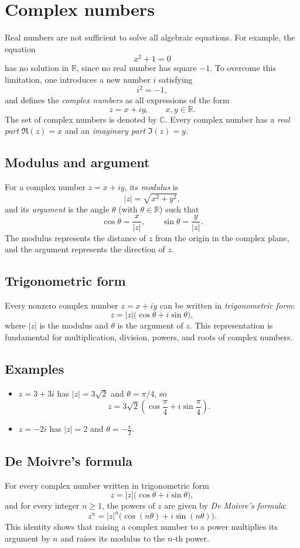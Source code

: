 \documentclass[11pt,a4paper]{article}
\theoremstyle{definition} \newtheorem{definition}{Definition} \theoremstyle{plain} \newtheorem{theorem}{Theorem}
\begin{document}
\section{Complex numbers}\label{sec:complex}
Real numbers are not sufficient to solve all algebraic equations.
For example, the equation
\[ x^2 + 1 = 0 \]
has no solution in $\mathbb{R}$, since no real number has square $-1$.
To overcome this limitation, one introduces a new number $i$ satisfying
\[ i^2 = -1, \]
and defines the \emph{complex numbers} as all expressions of the form
\[ z = x + iy, \qquad x,y\in\mathbb{R}. \]
The set of complex numbers is denoted by $\mathbb{C}$.
Every complex number has a \emph{real part} $\Re(z)=x$ and an \emph{imaginary part} $\Im(z)=y$.
\subsection{Modulus and argument}
For a complex number $z=x+iy$, its \emph{modulus} is
\[ |z| = \sqrt{x^2 + y^2}, \]
and its \emph{argument} is the angle $\theta$ (with $\theta\in\mathbb{R}$) such that
\[ \cos\theta = \frac{x}{|z|}, \qquad \sin\theta = \frac{y}{|z|}. \]
The modulus represents the distance of $z$ from the origin in the complex plane, and the argument represents the direction of $z$.
\subsection{Trigonometric form}
Every nonzero complex number $z=x+iy$ can be written in \emph{trigonometric form}:
\[ z = |z|\bigl(\cos\theta + i\sin\theta\bigr), \]
where $|z|$ is the modulus and $\theta$ is the argument of $z$.
This representation is fundamental for multiplication, division, powers, and roots of complex numbers.
\subsection*{Examples}
\begin{itemize}
\item $z = 3 + 3i$ has $|z| = 3\sqrt{2}$ and $\theta = \pi/4$, so
\[
z = 3\sqrt{2}\left(\cos\frac{\pi}{4} + i\sin\frac{\pi}{4}\right).
\]
\item $z = -2i$ has $|z| = 2$ and $\theta = -\frac{\pi}{2}$. \end{itemize}
\subsection{De Moivre's formula}
For every complex number written in trigonometric form
\[ z = |z|\bigl(\cos\theta + i\sin\theta\bigr), \]
and for every integer $n\ge 1$, the powers of $z$ are given by \emph{De Moivre's formula}:
\[\boxed{ z^n = |z|^n\bigl(\cos(n\theta) + i\sin(n\theta)\bigr). }\]
This identity shows that raising a complex number to a power multiplies its argument by $n$ and raises its modulus to the $n$-th power.
\end{document}

